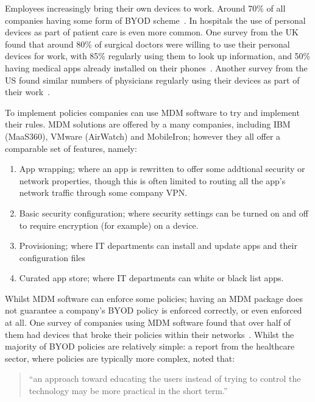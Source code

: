 \documentclass[a4paper]{scrartcl}
\begin{document}
Employees increasingly bring their own devices to work. Around 70\% of all
companies having some form of \ac{BYOD} scheme~\cite{schulze_byod_2016}. In
hospitals the use of personal devices as part of patient care is even more
common. One survey from the UK found that around 80\% of surgical doctors were
willing to use their personal devices for work, with 85\% regularly using them
to look up information, and 50\% having medical apps already installed on their
phones~\cite{patel_uk_2015}. Another survey from the US found similar numbers of
physicians regularly using their devices as part of their
work~\cite{moyer_managing_2013}.

To implement policies companies can use \ac{MDM} software to try and implement
their rules.  \ac{MDM} solutions are offered by a many companies, including IBM
(MaaS360), VMware (AirWatch) and MobileIron; however they all offer a
comparable set of features, namely:
\begin{enumerate}
\item App wrapping; where an app is rewritten to offer some addtional security
  or network properties, though this is often limited to routing all the app's
  network traffic through some company VPN.
\item Basic security configuration; where security settings can be turned on and
  off to require encryption (for example) on a device.
\item Provisioning; where IT departments can install and update apps and
  their configuration files
\item Curated app store; where IT departments can white or black list apps.
\end{enumerate}



Whilst \ac{MDM} software can enforce some policies; having an \ac{MDM} package
does not guarantee a company's BYOD policy is enforced correctly, or even
enforced at all. One survey of companies using \ac{MDM} software found that over
half of them had devices that broke their policies within their
networks~\cite{mobileiron_security_labs_q4_2015}. Whilst the majority of BYOD
policies are relatively simple: a report from the healthcare sector, where
policies are typically more complex, noted that:

\begin{quote}
  ``an approach toward educating the users instead of trying to control the
  technology may be more practical in the short term.''~\cite{moyer_managing_2013}
\end{quote}
\end{document}
